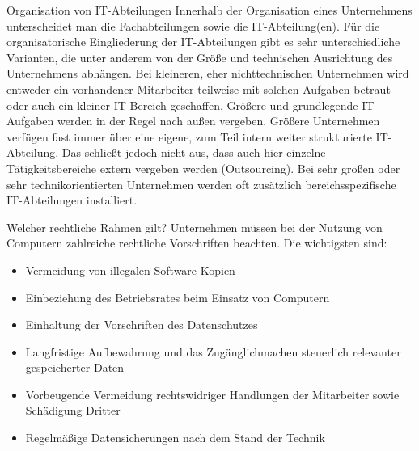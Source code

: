 \documentclass[a6paper,10pt,grid=front%
,toc
]{kartei}
\begin{document}
  \begin{karte}{Organisation von IT-Abteilungen}  
    Innerhalb der Organisation eines Unternehmens unterscheidet man die Fachabteilungen sowie die IT-Abteilung(en). Für die organisatorische Eingliederung der IT-Abteilungen gibt es sehr unterschiedliche Varianten, die unter anderem von der Größe und technischen Ausrichtung des Unternehmens abhängen. Bei kleineren, eher nichttechnischen Unternehmen wird entweder ein vorhandener Mitarbeiter teilweise mit solchen Aufgaben betraut oder auch ein kleiner IT-Bereich geschaffen. Größere und grundlegende IT-Aufgaben werden in der Regel nach außen vergeben. Größere Unternehmen verfügen fast immer über eine eigene, zum Teil intern weiter strukturierte IT-Abteilung. Das schließt jedoch nicht aus, dass auch hier einzelne Tätigkeitsbereiche extern vergeben werden (Outsourcing). Bei sehr großen oder sehr technikorientierten Unternehmen werden oft zusätzlich bereichsspezifische IT-Abteilungen installiert.
  \end{karte}

  \begin{karte}{Welcher rechtliche Rahmen gilt?}  
    Unternehmen müssen bei der Nutzung von Computern zahlreiche rechtliche Vorschriften beachten. Die wichtigsten sind:
        
    \begin{itemize}
      \item Vermeidung von illegalen Software-Kopien
      \item Einbeziehung des Betriebsrates beim Einsatz von Computern
      \item Einhaltung der Vorschriften des Datenschutzes
      \item Langfristige Aufbewahrung und das Zugänglichmachen steuerlich relevanter gespeicherter Daten
      \item Vorbeugende Vermeidung rechtswidriger Handlungen der Mitarbeiter sowie Schädigung Dritter
      \item Regelmäßige Datensicherungen nach dem Stand der Technik
    \end{itemize}
  \end{karte}
\end{document}

